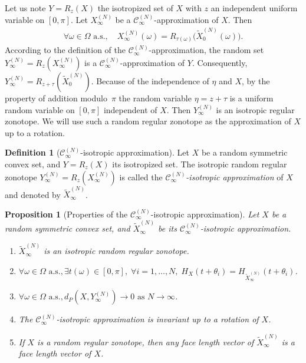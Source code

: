\documentclass[numbers,compress,v1.0.1]{vmsta}
\newtheorem{proposition}{Proposition}
\theoremstyle{definition}
\newtheorem{definition}{Definition}
\begin{document}
Let us note $Y=R_z(X)$ the isotropized set of $X$ with $z$ an
independent uniform variable on $[0,\pi]$.
Let $X_\infty^{(N)}$ be a $\mathcal{C}_\infty^{(N)}$-approximation of
$X$. Then
%
\begin{align*}
\forall\omega\in\varOmega\text{ a.s.},\quad  X_\infty^{(N)}(
\omega)=R_{\tau
(\omega)}\bigl(\tilde{X}_0^{(N)}(\omega)
\bigr).
\end{align*}
%
According to the definition of the $\mathcal{C}_\infty
^{(N)}$-approximation, the random set $Y_\infty^{(N)}=R_z(X_\infty
^{(N)})$ is a $\mathcal{C}_\infty^{(N)}$-approximation of $Y$.
Consequently, $Y_\infty^{(N)}=R_{z+\tau}(\tilde{X}_0^{(N)})$. Because
of the independence of $\eta$ and $X$, by the property of addition
modulo~$\pi$ the random variable $\eta=z+\tau$ is a uniform random
variable on $[0,\pi]$ independent of $X$. Then $Y_\infty^{(N)}$ is an
isotropic regular zonotope. We will use such a random regular zonotope
as the approximation of $X$ up to a rotation.
%
\begin{definition}[$\mathcal{C}_\infty^{(N)}$-isotropic approximation]
Let $X$ be a random symmetric convex set, and $Y=R_z(X)$ its
isotropized set. The isotropic random regular zonotope $Y_\infty
^{(N)}=R_z(X_\infty^{(N)})$ is called the \textit{$\mathcal{C}_\infty
^{(N)}$-isotropic approximation} of $X$ and denoted by $\tilde{X}_\infty^{(N)}$.
\end{definition}
%
\begin{proposition}[Properties of the $\mathcal{C}_\infty ^{(N)}$-isotropic approximation]
Let $X$ be a random symmetric convex set, and $\tilde{X}_\infty^{(N)}$
be its $\mathcal{C}_\infty^{(N)}$-isotropic approximation.
%
\begin{enumerate}
%
\item$\tilde{X}_\infty^{(N)}$ is an isotropic random regular zonotope.
%
\item$\forall\omega\in\varOmega\text{ a.s.},\exists t(\omega)\in[0,\pi
],\; \forall i=1,\dots, N,\; H_X(t+\theta_i)=H_{\tilde{X}_\infty
^{(N)}}(t+\theta_i)$.
%
\item$\forall\omega\in\varOmega\text{ a.s.},d_P(X,Y_\infty
^{(N)})\rightarrow0\text{ as } N\rightarrow\infty$.
%
\item The $\mathcal{C}_\infty^{(N)}$-isotropic approximation is
invariant up to a rotation of $X$.
%
\item If $X$ is a random regular zonotope, then any face length vector
of $\tilde{X}_\infty^{(N)}$ is a face length vector of $X$.
\end{enumerate}
%
\end{proposition}
\end{document}

